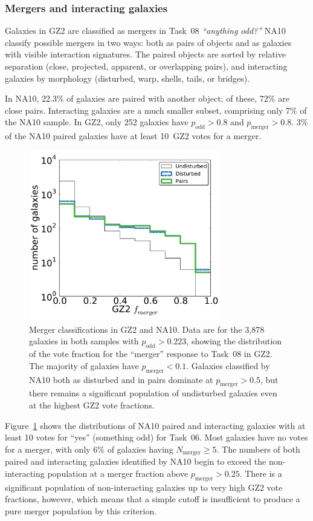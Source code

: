 \documentclass[useAMS,usenatbib]{mn2e}
\begin{document}
\subsubsection{Mergers and interacting galaxies}

Galaxies in GZ2 are classified as mergers in Task~08 {\it ``anything odd?''} NA10 classify possible mergers in two ways: both as pairs of objects and as galaxies with visible interaction signatures. The paired objects are sorted by relative separation (close, projected, apparent, or overlapping pairs), and interacting galaxies by morphology (disturbed, warp, shells, tails, or bridges). 

In NA10, 22.3\% of galaxies are paired with another object; of these, 72\% are close pairs. Interacting galaxies are a much smaller subset, comprising only 7\% of the NA10 sample. In GZ2, only 252 galaxies have $p_\mathrm{odd}>0.8$ and $p_\mathrm{merger}>0.8$. 3\% of the NA10 paired galaxies have at least 10~GZ2 votes for a merger. 

\begin{figure}
\includegraphics[angle=0,width=3.3in]{figures/na_mergers_new.pdf}
\caption{Merger classifications in GZ2 and NA10. Data are for the 3,878 galaxies in both samples with $p_\mathrm{odd}>0.223$, showing the distribution of the vote fraction for the ``merger'' response to Task~08 in GZ2. The majority of galaxies have $p_\mathrm{merger}<0.1$. Galaxies classified by NA10 both as disturbed and in pairs dominate at $p_\mathrm{merger}>0.5$, but there remains a significant population of undisturbed galaxies even at the highest GZ2 vote fractions.
\label{fig-na_pairs}}
\end{figure}

Figure~\ref{fig-na_pairs} shows the distributions of NA10 paired and interacting galaxies with at least 10 votes for ``yes'' (something odd) for Task~06. Most galaxies have no votes for a merger, with only 6\% of galaxies having $N_\mathrm{merger}\ge5$. The numbers of both paired and interacting galaxies identified by NA10 begin to exceed the non-interacting population at a merger fraction above $p_\mathrm{merger}>0.25$. There is a significant population of non-interacting galaxies up to very high GZ2 vote fractions, however, which means that a simple cutoff is insufficient to produce a pure merger population by this criterion. 
\end{document}
